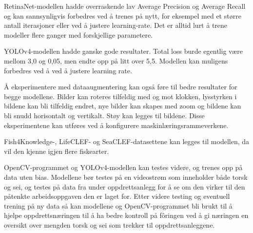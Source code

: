 RetinaNet-modellen hadde overraskende lav Average Precision og Average Recall og kan sannsynligvis forbedres ved å trenes på nytt, for eksempel med et større antall iterasjoner eller ved å justere learning-rate. Det er alltid lurt å trene modeller flere ganger med forskjellige parametere.

YOLOv4-modellen hadde ganske gode resultater. Total loss burde egentlig være mellom 3,0 og 0,05, men endte opp på litt over 5,5. Modellen kan muligens forbedres ved å ved å justere learning rate. 

Å eksperimentere med dataaugmentering kan også føre til bedre resultater for begge modellene. Bilder kan roteres tilfeldig med og mot klokken, lysstyrken i bildene kan bli tilfeldig endret, nye bilder kan skapes med zoom og bildene kan bli snudd horisontalt og vertikalt. Støy kan legges til bildene. Disse eksperimentene kan utføres ved å konfigurere maskinlæringsrammeverkene. 

Fish4Knowledge-, LifeCLEF- og SeaCLEF-datasettene kan legges til modellen, da vil den kjenne igjen flere fiskearter.

OpenCV-programmet og YOLOv4-modellen kan testes videre, og trenes opp på data uten bias. Modellene bør testes på en videostrøm som inneholder både torsk og sei, og testes på data fra under oppdrettsanlegg for å se om den virker til den påtenkte arbeidsoppgaven den er laget for. Etter videre testing og eventuell trening på ny data så kan modellene og OpenCV-programmet bli brukt til å hjelpe oppdrettsnæringen til å ha bedre kontroll på fôringen ved å gi næringen en oversikt over mengden torsk og sei som trekker til oppdrettsanleggene.

